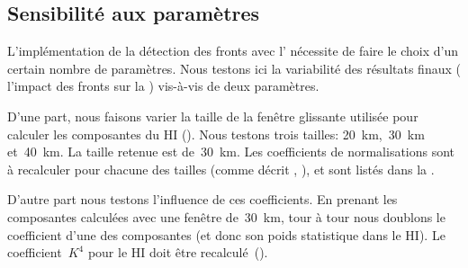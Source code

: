 \begin{figure}
  \centering
  \label{fig:verif-hist}
\end{figure}

\begin{figure}
  \centering
  \label{fig:hists-sst-latbands}
\end{figure}

\subsection{Sensibilité aux paramètres}
\label{sec:sensibilite-parametres}

L'implémentation de la détection des fronts avec l' nécessite de faire le choix d'un certain nombre de paramètres. Nous testons ici la variabilité des résultats finaux ( l'impact des fronts sur la ) vis-à-vis de deux paramètres.

D'une part, nous faisons varier la taille de la fenêtre glissante utilisée pour calculer les composantes du HI ().
Nous testons trois tailles: \qty{20}{\km},~\qty{30}{\km} et~\qty{40}{\km}. La taille retenue est de~\qty{30}{\km}.
Les coefficients de normalisations sont à recalculer pour chacune des tailles (comme décrit , ), et sont listés dans la .

D'autre part nous testons l'influence de ces coefficients. En prenant les composantes calculées avec une fenêtre de~\qty{30}{\km}, tour à tour nous doublons le coefficient d'une des composantes (et donc son poids statistique dans le HI). Le coefficient~\(K^4\) pour le HI doit être recalculé~().

